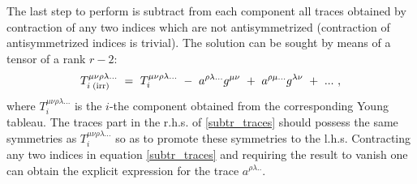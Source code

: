 \documentclass[12pt]{revtex4}
\begin{document}
	The last step to perform is subtract from each component
	all traces obtained by contraction of any two indices which
	are not antisymmetrized (contraction of antisymmetrized indices is
	trivial).
	The solution can be sought by means of a tensor of a rank
	$ r - 2 $:
\begin{equation}
\label{subtr_traces}
	T_{i\;{\rm (irr)}}^{\mu\nu\rho\lambda...} ~=~
	T_i^{\mu\nu\rho\lambda...}  ~-~  a^{\rho\lambda...}g^{\mu\nu} 
				  ~+~  a^{\rho\mu...}g^{\lambda\nu} ~+~ ...~,
\end{equation}
	where $ T_i^{\mu\nu\rho\lambda...} $ is the $ i $-the component
	obtained from the corresponding Young tableau.
	The traces part in the r.h.s. of \eqref{subtr_traces} should 
	possess the same symmetries as $ T_i^{\mu\nu\rho\lambda...} $
	so as to promote these symmetries to the l.h.s.
	Contracting any two indices in equation \eqref{subtr_traces} and
	requiring the result to vanish one can obtain the explicit expression
	for the trace $ a^{\rho\lambda..} $.


	

	
	
\end{document}
